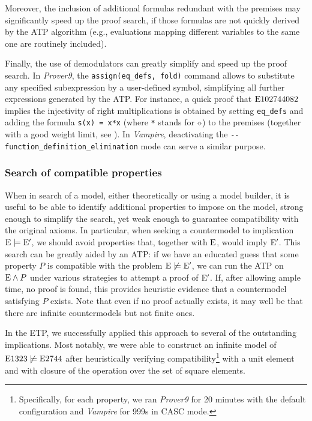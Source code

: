 Moreover, the inclusion of additional formulas redundant with the premises may significantly speed up the proof search, if those formulas are not quickly derived by the ATP algorithm (e.g., evaluations mapping different variables to the same one are routinely included).

Finally, the use of demodulators can greatly simplify and speed up the proof search. In \emph{Prover9}, the \verb|assign(eq_defs, fold)| command allows to substitute any specified subexpression by a user-defined symbol, simplifying all further expressions generated by the ATP\@. For instance, a quick proof that $\mathrm{E}102744082$ implies the injectivity of right multiplications is obtained by setting \verb|eq_defs| and adding the formula \verb|s(x) = x*x| (where \verb|*| stands for $\diamond$) to the premises (together with a good weight limit, see ). In \emph{Vampire}, deactivating the \verb|--function_definition_elimination| mode can serve a similar purpose.

\subsubsection{Search of compatible properties} When in search of a model, either theoretically or using a model builder, it is useful to be able to identify additional properties to impose on the model, strong enough to simplify the search, yet weak enough to guarantee compatibility with the original axioms. In particular, when seeking a countermodel to implication $\mathrm{E}\models\mathrm{E}'$, we should avoid properties that, together with $\mathrm{E}$, would imply $\mathrm{E}'$. This search can be greatly aided by an ATP: if we have an educated guess that some property $P$ is compatible with the problem $\mathrm{E}\not\models\mathrm{E}'$, we can run the ATP on $\mathrm{E}\wedge P$ under various strategies to attempt a proof of $\mathrm{E}'$. If, after allowing ample time, no proof is found, this provides heuristic evidence that a countermodel satisfying $P$ exists. Note that even if no proof actually exists, it may well be that there are infinite countermodels but not finite ones.

In the ETP, we successfully applied this approach to several of the outstanding implications. Most notably, we were able to construct an infinite model of $\mathrm{E}1323\not\models\mathrm{E}2744$ after heuristically verifying compatibility\footnote{Specifically, for each property, we ran \emph{Prover9} for 20 minutes with the default configuration and \emph{Vampire} for 999s in CASC mode.} with a unit element and with closure of the operation over the set of square elements.

